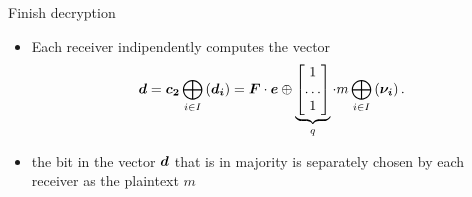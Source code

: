 \begin{frame}
\begin{overprint}
 \begin{block}{Finish decryption}
 \begin{itemize}
  \item Each receiver indipendently computes the vector 
 \begin{eqnarray*}
 \boldsymbol{d} =  \boldsymbol{c_2} \bigoplus_{i \in I} \left( \boldsymbol{d_i} \right)  
 	  =  \boldsymbol{F}\cdot \boldsymbol{e} \mathbin{\oplus} \underbrace{\begin{bmatrix} 1 \\ \dots \\ 1 \end{bmatrix}}_{q} \cdot m \bigoplus_{i \in I} \left( \boldsymbol{\nu_i} \right) .
 \end{eqnarray*}
 \item the bit in the vector $\boldsymbol{d}$ that is in majority is separately chosen by each receiver as the plaintext $m$
 \end{itemize}
 \end{block}
 

 \end{overprint}

  

\end{frame}

